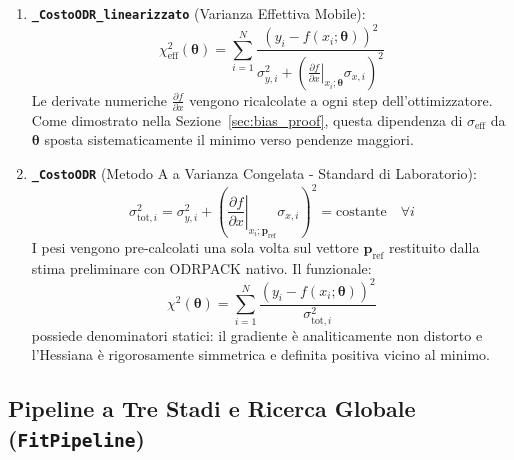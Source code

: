 \documentclass[11pt,a4paper]{article}
\begin{document}
\begin{enumerate}
    \item \textbf{\texttt{\_CostoODR\_linearizzato}} (Varianza Effettiva Mobile):
    \begin{equation}
        \chi^2_{\text{eff}}(\boldsymbol{\theta}) = \sum_{i=1}^N \frac{\left(y_i - f(x_i; \boldsymbol{\theta})\right)^2}{\sigma_{y, i}^2 + \left(\left.\frac{\partial f}{\partial x}\right|_{x_i; \boldsymbol{\theta}} \sigma_{x, i}\right)^2}
    \end{equation}
    Le derivate numeriche $\frac{\partial f}{\partial x}$ vengono ricalcolate a ogni step dell'ottimizzatore. Come dimostrato nella Sezione~\ref{sec:bias_proof}, questa dipendenza di $\sigma_{\text{eff}}$ da $\boldsymbol{\theta}$ sposta sistematicamente il minimo verso pendenze maggiori.
    
    \item \textbf{\texttt{\_CostoODR}} (Metodo A a Varianza Congelata - Standard di Laboratorio):
    \begin{equation}
        \sigma_{\text{tot}, i}^2 = \sigma_{y, i}^2 + \left(\left.\frac{\partial f}{\partial x}\right|_{x_i; \mathbf{p}_{\text{ref}}} \sigma_{x, i}\right)^2 = \text{costante} \quad \forall i
    \end{equation}
    I pesi vengono pre-calcolati una sola volta sul vettore $\mathbf{p}_{\text{ref}}$ restituito dalla stima preliminare con ODRPACK nativo. Il funzionale:
    \begin{equation}
        \chi^2(\boldsymbol{\theta}) = \sum_{i=1}^N \frac{\left(y_i - f(x_i; \boldsymbol{\theta})\right)^2}{\sigma_{\text{tot}, i}^2}
    \end{equation}
    possiede denominatori statici: il gradiente è analiticamente non distorto e l'Hessiana è rigorosamente simmetrica e definita positiva vicino al minimo.
\end{enumerate}

\subsection{Pipeline a Tre Stadi e Ricerca Globale (\texttt{FitPipeline})}
\end{document}
